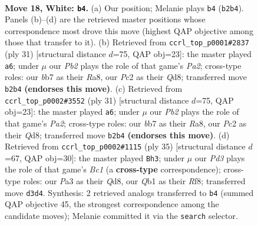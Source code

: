 \documentclass[11pt]{article}
\begin{document}
\clearpage

\begin{figure}[p]\centering
\begin{subfigure}{0.46\textwidth}\centering
\resizebox{\linewidth}{!}{%
\newchessgame
\chessboard[
  setfen={1r1q1b2/1bp1rppk/p1np4/1p1Bp2p/4P3/P2P1N1P/1PPBRPP1/RQ3K2 w - - 2 18},
  showmover=false,
  pgfstyle=straightmove, color=movearrow, markmove={b2-b4}
]}
\caption{}
\end{subfigure}\hfill
\begin{subfigure}{0.46\textwidth}\centering
\resizebox{\linewidth}{!}{%
\newchessgame
\chessboard[
  setfen={r1bqr1k1/p4p1p/1p1p2p1/2pPb3/Pn2P3/2N1BP2/1P1QB1PP/R4RK1 b - - 1 16},
  showmover=false,
  pgfstyle=straightmove, color=movearrow, markmove={a7-a6}
]}
\caption{}
\end{subfigure}
\\[4pt]
\begin{subfigure}{0.46\textwidth}\centering
\resizebox{\linewidth}{!}{%
\newchessgame
\chessboard[
  setfen={r1bqr1k1/p4p1p/1p1p2p1/2pPb3/Pn2P3/2N1BP2/1P1QB1PP/R4RK1 b - - 1 16},
  showmover=false,
  pgfstyle=straightmove, color=movearrow, markmove={a7-a6}
]}
\caption{}
\end{subfigure}\hfill
\begin{subfigure}{0.46\textwidth}\centering
\resizebox{\linewidth}{!}{%
\newchessgame
\chessboard[
  setfen={r1bq1rk1/1p3p2/p2p3p/2pP2pn/P2bP3/2NB1PP1/1P1B3P/R2Q1R1K b - - 2 18},
  showmover=false,
  pgfstyle=straightmove, color=movearrow, markmove={c8-h3}
]}
\caption{}
\end{subfigure}
\caption{\textbf{Move 18, White: \texttt{b4}.} (a) Our position; Melanie plays \texttt{b4} (\texttt{b2b4}). Panels (b)--(d) are the retrieved master positions whose correspondence most drove this move (highest QAP objective among those that transfer to it). (b) Retrieved from \texttt{ccrl\_top\_p0001\#2837} (ply 31) [structural distance $d$=75, QAP obj=23]: the master played \texttt{a6}; under $\mu$ our \emph{Pb2} plays the role of that game's \emph{Pa2}; cross-type roles: our \emph{b}b7 as their \emph{R}a8, our \emph{P}c2 as their \emph{Q}d8; transferred move \texttt{b2b4} \textbf{(endorses this move)}. (c) Retrieved from \texttt{ccrl\_top\_p0002\#3552} (ply 31) [structural distance $d$=75, QAP obj=23]: the master played \texttt{a6}; under $\mu$ our \emph{Pb2} plays the role of that game's \emph{Pa2}; cross-type roles: our \emph{b}b7 as their \emph{R}a8, our \emph{P}c2 as their \emph{Q}d8; transferred move \texttt{b2b4} \textbf{(endorses this move)}. (d) Retrieved from \texttt{ccrl\_top\_p0002\#1115} (ply 35) [structural distance $d$=67, QAP obj=30]: the master played \texttt{Bh3}; under $\mu$ our \emph{Pd3} plays the role of that game's \emph{Bc1} (a \textbf{cross-type} correspondence); cross-type roles: our \emph{P}a3 as their \emph{Q}d8, our \emph{Q}b1 as their \emph{R}f8; transferred move \texttt{d3d4}. Synthesis: 2 retrieved analogs transferred to \texttt{b4} (summed QAP objective 45, the strongest correspondence among the candidate moves); Melanie committed it via the \texttt{search} selector.}
\label{fig:thought-m34}
\end{figure}
\end{document}
